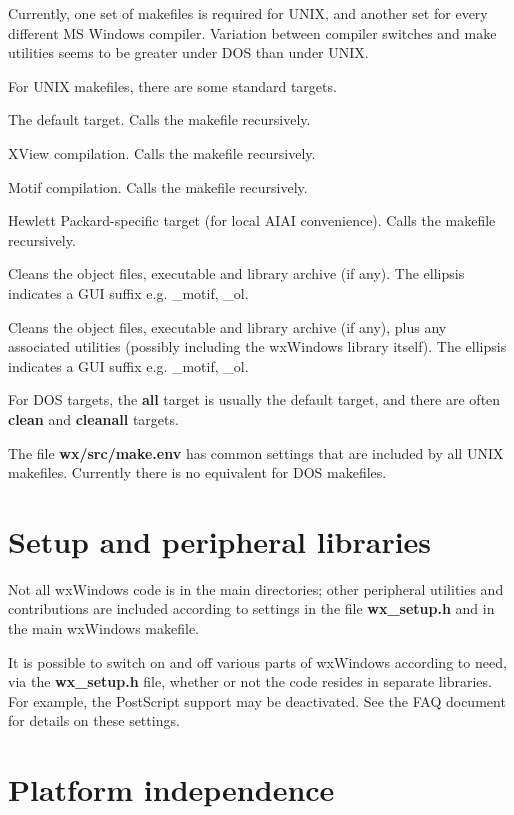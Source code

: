 Currently, one set of makefiles is required for UNIX, and another set
for every different MS Windows compiler. Variation between compiler
switches and make utilities seems to be greater under DOS than
under UNIX.

For UNIX makefiles, there are some standard targets.

\begin{description}\itemsep=0pt
\item[all] The default target. Calls the makefile recursively.
\item[xview] XView compilation. Calls the makefile recursively.
\item[motif] Motif compilation. Calls the makefile recursively.
\item[hp] Hewlett Packard-specific target (for local AIAI convenience). Calls the makefile recursively.
\item[clean...] Cleans the object files, executable and library archive (if any). The ellipsis
indicates a GUI suffix e.g. \_motif, \_ol.
\item[cleanall...] Cleans the object files, executable and library archive (if any),
plus any associated utilities (possibly including the wxWindows library itself).
The ellipsis indicates a GUI suffix e.g. \_motif, \_ol.
\end{description}

For DOS targets, the {\bf all} target is usually the default target, and there
are often {\bf clean} and {\bf cleanall} targets.

The file {\bf wx/src/make.env} has common settings that are included
by all UNIX makefiles. Currently there is no equivalent for DOS makefiles.

\section{Setup and peripheral libraries}

Not all wxWindows code is in the main directories; other peripheral utilities
and contributions are included according to settings in the file {\bf wx\_setup.h}\rtfsp
and in the main wxWindows makefile.

It is possible to switch on and off various parts of wxWindows according to need,
via the {\bf wx\_setup.h} file, whether or not the code resides in separate libraries.
For example, the PostScript support may be deactivated.
See the FAQ document for details on these settings.

\section{Platform independence}

